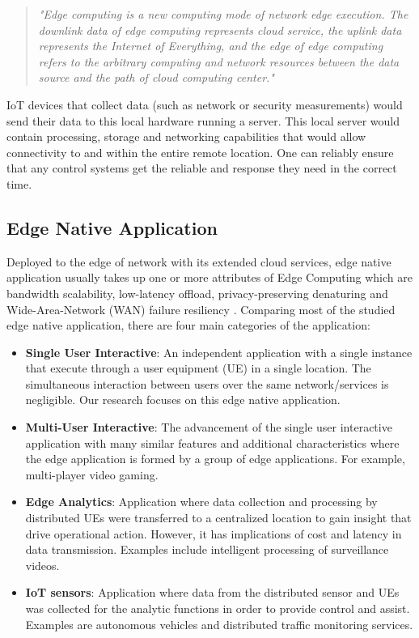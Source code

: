 \begin{quote}
    \textit{"Edge computing is a new computing mode of network edge execution. The downlink data of edge computing represents cloud service, the uplink data represents the Internet of Everything, and the edge of edge computing refers to the arbitrary computing and network resources between the data source and the path of cloud computing center."}
\end{quote}

IoT devices that collect data (such as network or security measurements) would send their data to this local hardware running a server. This local server would contain processing, storage and networking capabilities that would allow connectivity to and within the entire remote location. One can reliably ensure that any control systems get the reliable and response they need in the correct time. 

\subsection{Edge Native Application}
Deployed to the edge of network with its extended cloud services, edge native application usually takes up one or more attributes of Edge Computing which are bandwidth scalability, low-latency offload, privacy-preserving denaturing and Wide-Area-Network (WAN) failure resiliency \cite{satyanarayanan_klas_silva_mangiante_2019}. Comparing most of the studied edge native application, there are four main categories of the application:  
\begin{itemize}
    \item \textbf{Single User Interactive}: An independent application with a single instance that execute through a user equipment (UE) in a single location. The simultaneous interaction between users over the same network/services is negligible. Our research focuses on this edge native application.
    \item \textbf{Multi-User Interactive}: The advancement of the single user interactive application with many similar features and additional characteristics where the edge application is formed by a group of edge applications. For example, multi-player video gaming. 
    \item \textbf{Edge Analytics}: Application where data collection and processing by distributed UEs were transferred to a centralized location to gain insight that drive operational action. However, it has implications of cost and latency in data transmission. Examples include intelligent processing of surveillance videos.
    \item \textbf{IoT sensors}: Application where data from the distributed sensor and UEs was collected for the analytic functions in order to provide control and assist. Examples are autonomous vehicles and distributed traffic monitoring services. 
\end{itemize}

